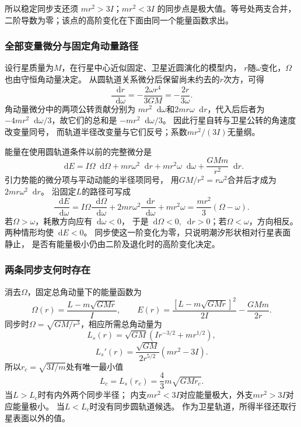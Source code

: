 \documentclass[UTF8,fontset=fandol,a4paper,11pt]{ctexart}
\newcommand{\dd}{\mathop{}\!\mathrm{d}}
\begin{document}
所以稳定同步支还须 $mr^2>3I$；$mr^2<3I$ 的同步点是极大值。等号处两支合并，二阶导数为零；该点的高阶变化在下面由同一个能量函数求出。
\subsubsection*{全部变量微分与固定角动量路径}
设行星质量为$M$，在行星中心近似固定、卫星近圆演化的模型内，
$r$随$\omega$变化，$\Omega$也由守恒角动量决定。
从圆轨道关系微分后保留尚未约去的$r$次方，可得
\[
\frac{\dd r}{\dd\omega}
=-\frac{2\omega r^4}{3GM}
=-\frac{2r}{3\omega}.
\]
角动量微分中的两项公转贡献分别为
$mr^2\dd\omega$和$2mr\omega\dd r$，代入后后者为
$-4mr^2\dd\omega/3$，故它们的总和是
$-mr^2\dd\omega/3$。
因此行星自转与卫星公转的角速度改变量同号，
而轨道半径改变量与它们反号；系数$mr^2/(3I)$无量纲。

能量在使用圆轨道条件以前的完整微分是
\[
\dd E=I\Omega\dd\Omega
+mr\omega^2\dd r+mr^2\omega\dd\omega
+\frac{GMm}{r^2}\dd r.
\]
引力势能的微分项与平动动能的半径项同号，
用$GM/r^2=r\omega^2$合并后才成为$2mr\omega^2\dd r$。
沿固定$L$的路径可写成
\[
\frac{\dd E}{\dd\omega}
=I\Omega\frac{\dd\Omega}{\dd\omega}
+2mr\omega^2\frac{\dd r}{\dd\omega}+mr^2\omega
=\frac{mr^2}{3}(\Omega-\omega).
\]
若$\Omega>\omega$，耗散方向应有$\dd\omega<0$，
于是$\dd\Omega<0,\dd r>0$；若$\Omega<\omega$，方向相反。
两种情形均使$\dd E<0$。
同步使这一阶变化为零，只说明潮汐形状相对行星表面静止，
是否有能量极小仍由二阶及退化时的高阶变化决定。

\subsubsection*{两条同步支何时存在}
消去$\Omega$，固定总角动量下的能量函数为
\[
\Omega(r)=\frac{L-m\sqrt{GMr}}{I},\qquad
E(r)=\frac{[L-m\sqrt{GMr}]^2}{2I}-\frac{GMm}{2r}.
\]
同步时$\Omega=\sqrt{GM/r^3}$，相应所需总角动量为
\[
L_s(r)=\sqrt{GM}\left(Ir^{-3/2}+mr^{1/2}\right),
\]
\[
L_s'(r)=\frac{\sqrt{GM}}{2r^{5/2}}(mr^2-3I).
\]
所以$r_c=\sqrt{3I/m}$处有唯一最小值
\[
L_c=L_s(r_c)=\frac43m\sqrt{GM r_c}.
\]
当$L>L_c$时有内外两个同步半径；
内支$mr^2<3I$对应能量极大，外支$mr^2>3I$对应能量极小。
当$L<L_c$时没有同步圆轨道候选。
作为卫星轨道，所得半径还取行星表面以外的值。
\end{document}
